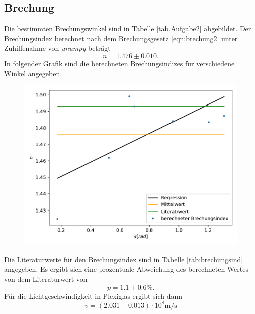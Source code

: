\subsection{Brechung}
\label{sec:brechungauswertung}
Die bestimmten Brechungswinkel sind in Tabelle \ref{tab.Aufgabe2} abgebildet.
Der Brechungsindex berechnet nach dem Brechungsgesetz \eqref{eqn:brechung2} unter Zuhilfenahme von \textit{unumpy}
beträgt
\begin{equation}
  n = 1.476 \pm 0.010.
  \label{eqn:brechungsindexausw}
\end{equation}
In folgender Grafik sind die berechneten Brechungsindizes für verschiedene Winkel angegeben.
\begin{figure}[H]
  \centering
  \includegraphics[scale=0.7]{auswertung/plot2.pdf}
  \label{fig:plot2ausw}
\end{figure}
\noindent
Die Literaturwerte für den Brechungsindex sind in Tabelle \ref{tab:brechungsind} angegeben.
Es ergibt sich eine prozentuale Abweichung des berechneten Wertes von dem Literaturwert von
\begin{equation}
  p = 1.1 \pm 0.6 \si{\percent}.
  \label{eqn:abweichung}
\end{equation}
Für die Lichtgeschwindigkeit in Plexiglas ergibt sich dann
\begin{equation}
  v=(2.031 \pm 0.013) \cdot 10^8 \si{\meter\per\second}
  \label{eqn:lichtgeschwausw}
\end{equation}

